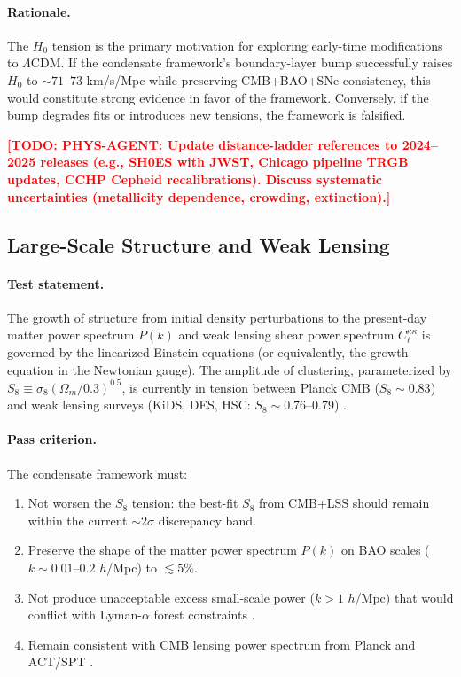 \documentclass[11pt,a4paper]{article}
\theoremstyle{definition}
\newcommand{\TODO}[1]{\textcolor{red}{\textbf{[TODO: #1]}}}
\begin{document}
\paragraph{Rationale.}
The $H_0$ tension is the primary motivation for exploring early-time modifications to $\Lambda$CDM. If the condensate framework's boundary-layer bump successfully raises $H_0$ to $\sim 71$--$73$ km/s/Mpc while preserving CMB+BAO+SNe consistency, this would constitute strong evidence in favor of the framework. Conversely, if the bump degrades fits or introduces new tensions, the framework is falsified.

\TODO{PHYS-AGENT: Update distance-ladder references to 2024--2025 releases (e.g., SH0ES with JWST, Chicago pipeline TRGB updates, CCHP Cepheid recalibrations). Discuss systematic uncertainties (metallicity dependence, crowding, extinction).}

\subsection{Large-Scale Structure and Weak Lensing}
\label{sec:LSS}

\paragraph{Test statement.}
The growth of structure from initial density perturbations to the present-day matter power spectrum $P(k)$ and weak lensing shear power spectrum $C_\ell^{\kappa\kappa}$ is governed by the linearized Einstein equations (or equivalently, the growth equation in the Newtonian gauge). The amplitude of clustering, parameterized by $S_8 \equiv \sigma_8 (\Omega_m/0.3)^{0.5}$, is currently in tension between Planck CMB ($S_8 \sim 0.83$) and weak lensing surveys (KiDS, DES, HSC: $S_8 \sim 0.76$--$0.79$) \cite{PlanckS8,DES2021,KiDS2020}.

\paragraph{Pass criterion.}
The condensate framework must:
\begin{enumerate}[leftmargin=2.2em]
  \item Not worsen the $S_8$ tension: the best-fit $S_8$ from CMB+LSS should remain within the current $\sim 2\sigma$ discrepancy band.
  \item Preserve the shape of the matter power spectrum $P(k)$ on BAO scales ($k \sim 0.01$--$0.2$ $h$/Mpc) to $\lesssim 5\%$.
  \item Not produce unacceptable excess small-scale power ($k > 1$ $h$/Mpc) that would conflict with Lyman-$\alpha$ forest constraints \cite{LymanAlpha}.
  \item Remain consistent with CMB lensing power spectrum from Planck and ACT/SPT \cite{PlanckLensing,ACTLensing}.
\end{enumerate}
\end{document}

